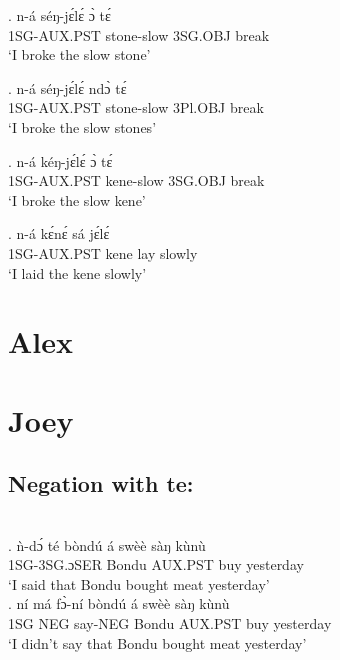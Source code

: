 \documentclass{assets/fieldnotes}
\begin{document}
{\exg. n-á séŋ-jɛ́lɛ́ ɔ̀ tɛ́\\
1SG-AUX.PST stone-slow 3SG.OBJ break\\
`I broke the slow stone'

\exg. n-á séŋ-jɛ́lɛ́ ndɔ̀ tɛ́\\
1SG-AUX.PST stone-slow 3Pl.OBJ break\\
`I broke the slow stones'

\exg. n-á kéŋ-jɛ́lɛ́ ɔ̀ tɛ́\\
1SG-AUX.PST kene-slow 3SG.OBJ break\\
`I broke the slow kene'


\exg. n-á kɛ́nɛ́ sá jɛ́lɛ́\\
1SG-AUX.PST kene lay slowly\\
`I laid the kene slowly'




\section{Alex}

\section{Joey}



\subsection{Negation with te:}

\\


\exg. ǹ-dɔ́ té bòndú á swèè sàŋ kùnù\\
1SG-3SG.ɔSER Bondu AUX.PST buy yesterday\\
`I said that Bondu bought meat yesterday' \\

\exg. ní má fɔ̀-ní bòndú á swèè sàŋ kùnù\\
1SG NEG say-NEG Bondu AUX.PST buy yesterday\\
`I didn't say that Bondu bought meat yesterday' \\



}
\end{document}
